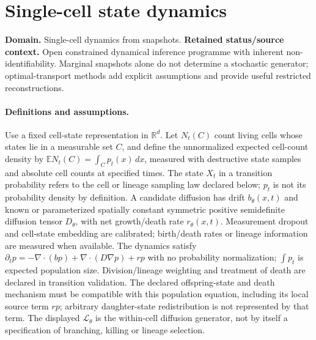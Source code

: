 \documentclass[11pt]{article}
\begin{document}
\section*{Single-cell state dynamics}
\label{prob:048}
\label{rank:61}
\par\smallskip

\noindent\textbf{Domain.} Single-cell dynamics from snapshots. \quad \textbf{Retained status/source context.} Open constrained dynamical inference programme with inherent non-identifiability. Marginal snapshots alone do not determine a stochastic generator; optimal-transport methods add explicit assumptions and provide useful restricted reconstructions.
\paragraph{Definitions and assumptions.} Use a fixed cell-state representation in $\mathbb{R}^d$. Let $N_t(C)$ count living cells whose states lie in a measurable set $C$, and define the unnormalized expected cell-count density by $\mathbb{E}N_t(C)=\int_C p_t(x)\,dx$, measured with destructive state samples and absolute cell counts at specified times. The state $X_t$ in a transition probability refers to the cell or lineage sampling law declared below; $p_t$ is not its probability density by definition. A candidate diffusion has drift $b_\theta(x,t)$ and known or parameterized spatially constant symmetric positive semidefinite diffusion tensor $D_\theta$, with net growth/death rate $r_\theta(x,t)$. Measurement dropout and cell-state embedding are calibrated; birth/death rates or lineage information are measured when available. The dynamics satisfy $\partial_t p=-\nabla\cdot(bp)+\nabla\cdot(D\nabla p)+rp$ with no probability normalization; $\int p_t$ is expected population size. Division/lineage weighting and treatment of death are declared in transition validation. The declared offspring-state and death mechanism must be compatible with this population equation, including its local source term $rp$; arbitrary daughter-state redistribution is not represented by that term. The displayed $\mathcal L_\theta$ is the within-cell diffusion generator, not by itself a specification of branching, killing or lineage selection.
\end{document}
